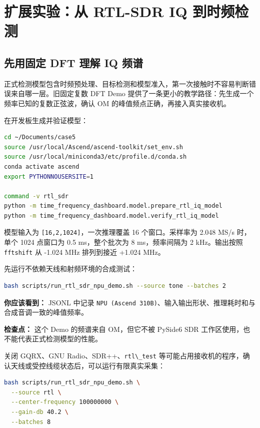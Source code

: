 \section{扩展实验：从 RTL-SDR IQ
到时频检测}\label{src-experiment-case5-rtl-sdr}

\subsection{先用固定 DFT 理解 IQ
频谱}\label{src-experiment-case5-rtl-dft-demo}

正式检测模型包含时频预处理、目标检测和模型准入，第一次接触时不容易判断错误来自哪一层。旧固定复数
DFT Demo 提供了一条更小的教学路径：先生成一个频率已知的复数正弦波，确认
OM 的峰值频点正确，再接入真实接收机。

在开发板生成并验证模型：

\begin{lstlisting}[language=bash]
cd ~/Documents/case5
source /usr/local/Ascend/ascend-toolkit/set_env.sh
source /usr/local/miniconda3/etc/profile.d/conda.sh
conda activate ascend
export PYTHONNOUSERSITE=1

command -v rtl_sdr
python -m time_frequency_dashboard.model.prepare_rtl_iq_model
python -m time_frequency_dashboard.model.verify_rtl_iq_model
\end{lstlisting}

模型输入为 \passthrough{\lstinline![16,2,1024]!}，一次推理覆盖 16
个窗口。采样率为 2.048 MS/s 时，单个 1024 点窗口为 0.5 ms，整个批次为 8
ms，频率间隔为 2 kHz。输出按照 \passthrough{\lstinline!fftshift!} 从
-1.024 MHz 排列到接近 +1.024 MHz。

先运行不依赖天线和射频环境的合成测试：

\begin{lstlisting}[language=bash]
bash scripts/run_rtl_sdr_npu_demo.sh --source tone --batches 2
\end{lstlisting}

\textbf{你应该看到：} JSONL 中记录
\passthrough{\lstinline!NPU (Ascend 310B)!}、输入输出形状、推理耗时和与合成音调一致的峰值频率。

\textbf{检查点：} 这个 Demo 的频谱来自 OM，但它不被 PySide6 SDR
工作区使用，也不能代表正式检测模型的性能。

关闭 GQRX、GNU Radio、SDR++、\passthrough{\lstinline!rtl\_test!}
等可能占用接收机的程序，确认天线或受控线缆状态后，可以运行有限真实采集：

\begin{lstlisting}[language=bash]
bash scripts/run_rtl_sdr_npu_demo.sh \
  --source rtl \
  --center-frequency 100000000 \
  --gain-db 40.2 \
  --batches 8
\end{lstlisting}

